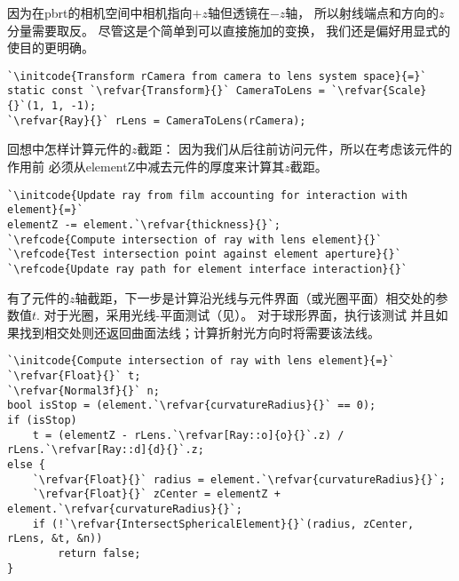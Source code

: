 因为在pbrt的相机空间中相机指向$+z$轴但透镜在$-z$轴，
所以射线端点和方向的$z$分量需要取反。
尽管这是个简单到可以直接施加的变换，
我们还是偏好用显式的使目的更明确。
\begin{lstlisting}
`\initcode{Transform rCamera from camera to lens system space}{=}`
static const `\refvar{Transform}{}` CameraToLens = `\refvar{Scale}{}`(1, 1, -1);
`\refvar{Ray}{}` rLens = CameraToLens(rCamera);
\end{lstlisting}

回想中怎样计算元件的$z$截距：
因为我们从后往前访问元件，所以在考虑该元件的作用前
必须从{\ttfamily elementZ}中减去元件的厚度来计算其$z$截距。
\begin{lstlisting}
`\initcode{Update ray from film accounting for interaction with element}{=}`
elementZ -= element.`\refvar{thickness}{}`;
`\refcode{Compute intersection of ray with lens element}{}`
`\refcode{Test intersection point against element aperture}{}`
`\refcode{Update ray path for element interface interaction}{}`
\end{lstlisting}

有了元件的$z$轴截距，下一步是计算沿光线与元件界面（或光圈平面）相交处的参数值$t$.
对于光圈，采用光线-平面测试（见）。
对于球形界面，执行该测试
并且如果找到相交处则还返回曲面法线；计算折射光方向时将需要该法线。
\begin{lstlisting}
`\initcode{Compute intersection of ray with lens element}{=}`
`\refvar{Float}{}` t;
`\refvar{Normal3f}{}` n;
bool isStop = (element.`\refvar{curvatureRadius}{}` == 0);
if (isStop)
    t = (elementZ - rLens.`\refvar[Ray::o]{o}{}`.z) / rLens.`\refvar[Ray::d]{d}{}`.z;
else {
    `\refvar{Float}{}` radius = element.`\refvar{curvatureRadius}{}`;
    `\refvar{Float}{}` zCenter = elementZ + element.`\refvar{curvatureRadius}{}`;
    if (!`\refvar{IntersectSphericalElement}{}`(radius, zCenter, rLens, &t, &n))
        return false;
}
\end{lstlisting}

